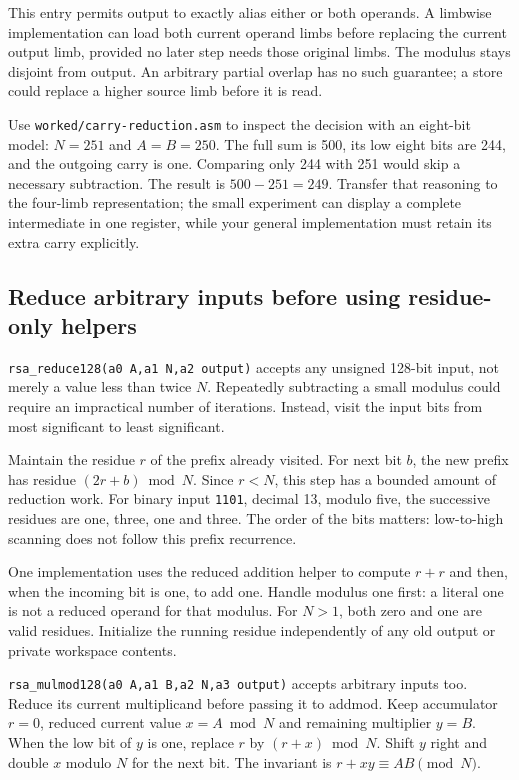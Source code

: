 This entry permits output to exactly alias either or both operands. A limbwise
implementation can load both current operand limbs before replacing the current
output limb, provided no later step needs those original limbs. The modulus
stays disjoint from output. An arbitrary partial overlap has no such guarantee;
a store could replace a higher source limb before it is read.

Use \texttt{worked/carry-reduction.asm} to inspect the decision with an
eight-bit model: $N=251$ and $A=B=250$. The full sum is 500, its low eight bits
are 244, and the outgoing carry is one. Comparing only 244 with 251 would skip
a necessary subtraction. The result is $500-251=249$. Transfer that reasoning
to the four-limb representation; the small experiment can display a complete
intermediate in one register, while your general implementation must retain its
extra carry explicitly.

\subsection*{Reduce arbitrary inputs before using residue-only helpers}

\texttt{rsa\_reduce128(a0 A,a1 N,a2 output)} accepts any unsigned 128-bit
input, not merely a value less than twice $N$. Repeatedly subtracting a small
modulus could require an impractical number of iterations. Instead, visit the
input bits from most significant to least significant.

Maintain the residue $r$ of the prefix already visited. For next bit $b$, the
new prefix has residue $(2r+b)\bmod N$. Since $r<N$, this step has a bounded
amount of reduction work. For binary input \texttt{1101}, decimal 13, modulo
five, the successive residues are one, three, one and three.
The order of the bits matters: low-to-high scanning does not follow this prefix
recurrence.

One implementation uses the reduced addition helper to compute $r+r$ and then,
when the incoming bit is one, to add one. Handle modulus one first: a literal
one is not a reduced operand for that modulus. For $N>1$, both zero and one
are valid residues. Initialize the running residue independently of any old
output or private workspace contents.

\texttt{rsa\_mulmod128(a0 A,a1 B,a2 N,a3 output)} accepts arbitrary inputs
too. Reduce its current multiplicand before passing it to addmod. Keep accumulator
$r=0$, reduced current value $x=A\bmod N$ and remaining multiplier $y=B$.
When the low bit of $y$ is one, replace $r$ by $(r+x)\bmod N$. Shift $y$
right and double $x$ modulo $N$ for the next bit. The invariant is
$r+xy\equiv AB\pmod N$.

